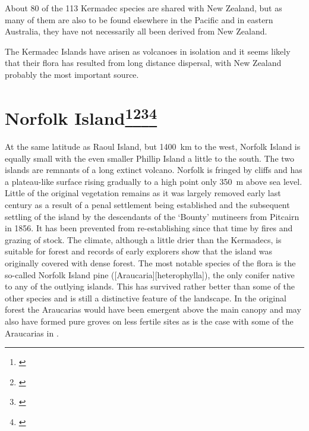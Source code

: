 About 80 of the 113 Kermadec species are shared with New Zealand, but as many of them are also to be found elsewhere in the Pacific and in eastern Australia, they have not necessarily all been derived from New Zealand.

The Kermadec Islands have arisen as volcanoes in isolation and it seems likely that their flora has resulted from long distance dispersal, with New Zealand probably the most important source.

\section[Norfolk Island]{Norfolk Island\thinspace\footnote{\cite{laing1915revised}}\footnote{\cite{turner1968conservation}}\footnote{\cite{green1970notes}}\footnote{\cite{green1979observations}}}

At the same latitude as Raoul Island, but \SI{1400}{\kilo\metre} to the west, Norfolk Island is equally small with the even smaller Phillip Island a little to the south.
The two islands are remnants of a long extinct volcano.
Norfolk is fringed by cliffs and has a plateau-like surface rising gradually to a high point only \SI{350}{\metre} above sea level.
Little of the original vegetation remains as it was largely removed early last century as a result of a penal settlement being established and the subsequent settling of the island by the descendants of the `Bounty' mutineers from Pitcairn in 1856.
It has been prevented from re-establishing since that time by fires and grazing of stock.
The climate, although a little drier than the Kermadecs, is suitable for forest and records of early explorers show that the island was originally covered with dense forest.
The most notable species of the flora is the so-called Norfolk Island pine ([Araucaria][heterophylla]), the only conifer native to any of the outlying islands.
This has survived rather better than some of the other species and is still a distinctive feature of the landscape.
In the original forest the Araucarias would have been emergent above the main canopy and may also have formed pure groves on less fertile sites as is the case with some of the Araucarias in .

